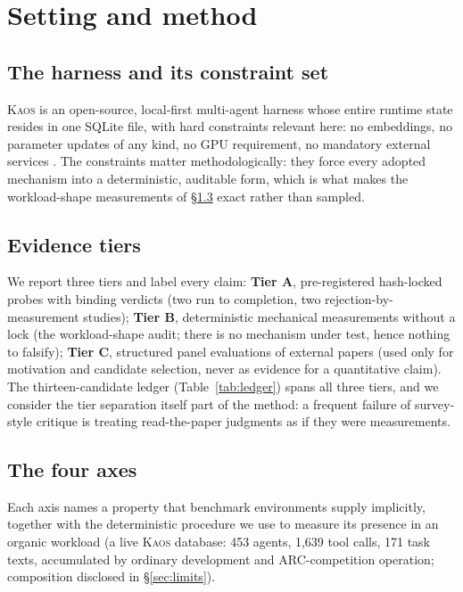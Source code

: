 \documentclass[11pt]{article}
\newcommand{\kaos}{\textsc{Kaos}}
\begin{document}
\section{Setting and method}

\subsection{The harness and its constraint set}

\kaos{} is an open-source, local-first multi-agent harness whose entire runtime state resides in one SQLite file, with hard constraints relevant here: no embeddings, no parameter updates of any kind, no GPU requirement, no mandatory external services \citep{canivel2026plasticity}. The constraints matter methodologically: they force every adopted mechanism into a deterministic, auditable form, which is what makes the workload-shape measurements of \S\ref{sec:axes} exact rather than sampled.

\subsection{Evidence tiers}

We report three tiers and label every claim: \textbf{Tier A}, pre-registered hash-locked probes with binding verdicts (two run to completion, two rejection-by-measurement studies); \textbf{Tier B}, deterministic mechanical measurements without a lock (the workload-shape audit; there is no mechanism under test, hence nothing to falsify); \textbf{Tier C}, structured panel evaluations of external papers (used only for motivation and candidate selection, never as evidence for a quantitative claim). The thirteen-candidate ledger (Table~\ref{tab:ledger}) spans all three tiers, and we consider the tier separation itself part of the method: a frequent failure of survey-style critique is treating read-the-paper judgments as if they were measurements.

\subsection{The four axes}
\label{sec:axes}

Each axis names a property that benchmark environments supply implicitly, together with the deterministic procedure we use to measure its presence in an organic workload (a live \kaos{} database: 453 agents, 1{,}639 tool calls, 171 task texts, accumulated by ordinary development and ARC-competition operation; composition disclosed in \S\ref{sec:limits}).
\end{document}
